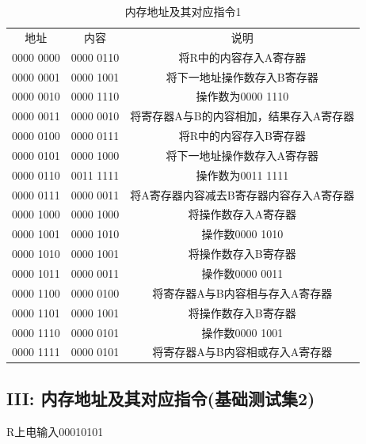 \documentclass[UTF8]{ctexart}
\begin{document}
    \begin{table}[!htb]
      \centering
      \begin{tabular}{|c|c|c|}
        \hline
        地址 & 内容 & 说明 \\
        0000 0000 & 0000 0110 &  将R中的内容存入A寄存器\\
        0000 0001 & 0000 1001 &  将下一地址操作数存入B寄存器\\
        0000 0010 & 0000 1110 &  操作数为0000 1110\\
        0000 0011 & 0000 0010 &  将寄存器A与B的内容相加，结果存入A寄存器\\
        0000 0100 & 0000 0111 &  将R中的内容存入B寄存器\\
        0000 0101 & 0000 1000 &  将下一地址操作数存入A寄存器\\
        0000 0110 & 0011 1111 &  操作数为0011 1111\\
        0000 0111 & 0000 0011 &  将A寄存器内容减去B寄存器内容存入A寄存器\\
        0000 1000 & 0000 1000 &  将操作数存入A寄存器\\
        0000 1001 & 0000 1010 &  操作数0000 1010\\
        0000 1010 & 0000 1001 &  将操作数存入B寄存器\\
        0000 1011 & 0000 0011 &  操作数0000 0011\\
        0000 1100 & 0000 0100 &  将寄存器A与B内容相与存入A寄存器\\
        0000 1101 & 0000 1001 &  将操作数存入B寄存器\\
        0000 1110 & 0000 0101 &  操作数0000 1001\\
        0000 1111 & 0000 0101 &  将寄存器A与B内容相或存入A寄存器\\
        \hline
      \end{tabular}
      \caption{内存地址及其对应指令1}\label{内存地址及其对应指令1}
    \end{table}
    \newpage

    \subsection{III: 内存地址及其对应指令(基础测试集2)}
    R上电输入00010101
\end{document}
